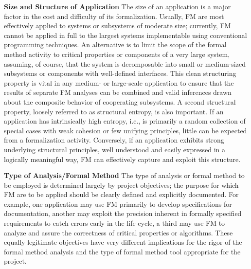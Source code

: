 \documentclass{template/openetcs_report}
\begin{document}
\textbf{Size and Structure of Application}
The size of an application is a major factor in the cost and difficulty of its formalization. 
Usually, FM are most effectively applied to systems or subsystems of moderate size; currently, FM cannot be applied in full to the largest systems implementable using conventional programming techniques. An alternative is to limit the scope of the formal method activity to critical properties or components of a very large system, assuming, of course, that the system is decomposable into small or medium-sized subsystems or components with well-defined interfaces. This clean structuring property is vital in any medium- or large-scale application to ensure that the results of separate FM analyses can be combined and valid inferences drawn about the composite behavior of cooperating subsystems.
A second structural property, loosely referred to as structural entropy, is also important. If an application has intrinsically high entropy, i.e., is primarily a random collection of special cases with weak cohesion or few unifying principles, little can be expected from a formalization activity. Conversely, if an application exhibits strong underlying structural principles, well understood and easily expressed in a logically meaningful way, FM can effectively capture and exploit this structure.

\textbf{Type of Analysis/Formal Method }
The type of analysis or formal method to be employed is determined largely by project objectives; the purpose for which FM are to be applied should be clearly defined and explicitly documented. For example, one application may use FM primarily to develop specifications for documentation, another may exploit the precision inherent in formally specified requirements to catch errors early in the life cycle, a third may use FM to analyze and assure the correctness of critical properties or algorithms. These equally legitimate objectives have very different implications for the rigor of the formal method analysis and the type of formal method tool appropriate for the project.
\end{document}
